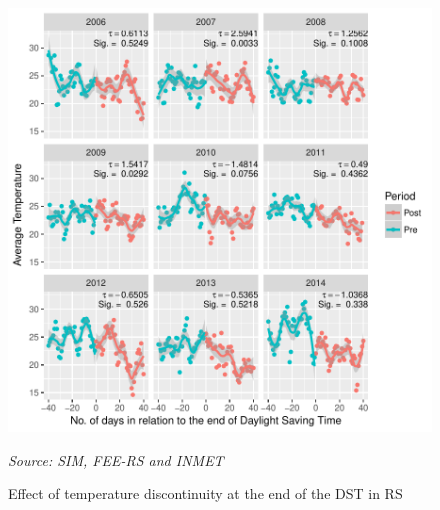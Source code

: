 \documentclass[12pt,openright,oneside,a4paper,english,french,spanish]{abntex2}
\numberwithin{table}{section} %
\numberwithin{figure}{section} %
\newcommand{\source}[1]{\textit{#1}}
\begin{document}
\begin{otherlanguage}{english}
\begin{subappendices}
\begin{figure}[H]
\begin{center}
\includegraphics{TESE_DE_DOUTORADO_RENAN_FINAL-plot_efeito_descontinuo_temp_saida}
\end{center}
\caption{Effect of temperature discontinuity at the end of the DST in RS}
\source{Source: SIM, FEE-RS and INMET}
\label{fig:efeito_descon_temp_saida_RS}
\end{figure}



\end{subappendices}
\end{otherlanguage}
\end{document}
